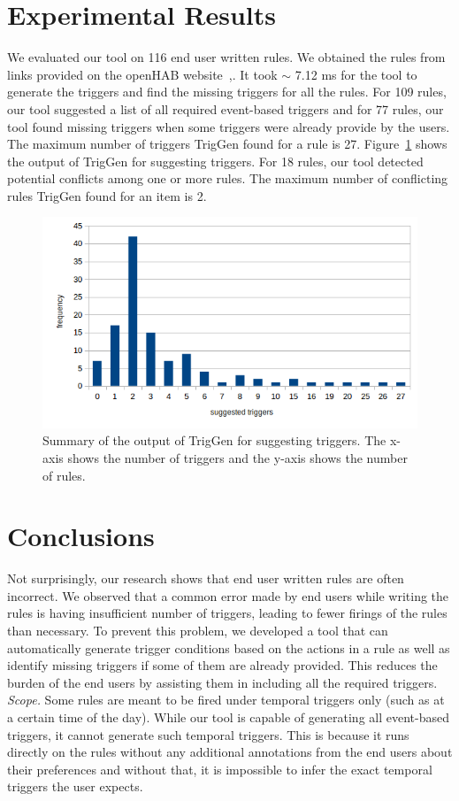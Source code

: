 \documentclass{sig-alternate-05-2015}
\begin{document}
\section{Experimental Results}
We evaluated our tool on 116 end user written rules. We obtained the rules from links provided on the openHAB website~\cite{data1},\cite{data2}. It took $\sim$ 7.12 ms for the tool to generate the triggers and find the missing triggers for all the rules. For 109 rules, our tool suggested a list of all required event-based triggers and for 77 rules, our tool found missing triggers when some triggers were already provide by the users. The maximum number of triggers TrigGen found for a rule is 27. Figure~\ref{fig:graph} shows the output of TrigGen for suggesting triggers.
For 18 rules, our tool detected potential conflicts among one or more rules. The maximum number of conflicting rules TrigGen found for an item is 2. 
\begin{figure}[h]
\centering
\includegraphics [trim=1cm 0 0 0, scale=0.6]{images/graph.png}
\caption{Summary of the output of TrigGen for suggesting triggers. The x-axis shows the number of triggers and the y-axis shows the number of rules.}
\label{fig:graph}
\end{figure} 

\section{Conclusions}
Not surprisingly, our research shows that end user written rules are often incorrect. We observed that a common error made by end users while writing the rules is having insufficient number of triggers, leading to fewer firings of the rules than necessary. To prevent this problem, we developed a tool that can automatically generate trigger conditions based on the actions in a rule as well as identify missing triggers if some of them are already provided. This reduces the burden of the end users by assisting them in including all the required triggers. \\
\emph{Scope.} Some rules are meant to be fired under temporal triggers only (such as at a certain time of the day). While our tool is capable of generating all event-based triggers, it cannot generate such temporal triggers. This is because it runs directly on the rules without any additional annotations from the end users about their preferences and without that, it is impossible to infer the exact temporal triggers the user expects. 


  
\end{document}
